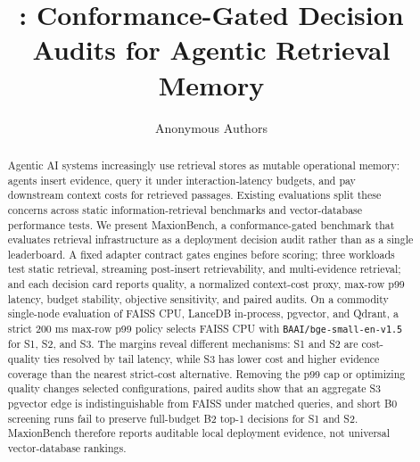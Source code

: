 \documentclass{article}
\title{\sys: Conformance-Gated Decision Audits for Agentic Retrieval Memory}
\author{Anonymous Authors}
\newcommand{\sys}{MaxionBench\xspace}
\newcommand{\maxrowp}{max-row p99\xspace}
\begin{document}
\maketitle

\begin{abstract}
Agentic AI systems increasingly use retrieval stores as mutable operational memory: agents insert evidence, query it under interaction-latency budgets, and pay downstream context costs for retrieved passages. Existing evaluations split these concerns across static information-retrieval benchmarks and vector-database performance tests. We present \sys, a conformance-gated benchmark that evaluates retrieval infrastructure as a deployment decision audit rather than as a single leaderboard. A fixed adapter contract gates engines before scoring; three workloads test static retrieval, streaming post-insert retrievability, and multi-evidence retrieval; and each decision card reports quality, a normalized context-cost proxy, \maxrowp latency, budget stability, objective sensitivity, and paired audits. On a commodity single-node evaluation of FAISS CPU, LanceDB in-process, pgvector, and Qdrant, a strict 200 ms \maxrowp policy selects FAISS CPU with \texttt{BAAI/bge-small-en-v1.5} for S1, S2, and S3. The margins reveal different mechanisms: S1 and S2 are cost-quality ties resolved by tail latency, while S3 has lower cost and higher evidence coverage than the nearest strict-cost alternative. Removing the p99 cap or optimizing quality changes selected configurations, paired audits show that an aggregate S3 pgvector edge is indistinguishable from FAISS under matched queries, and short B0 screening runs fail to preserve full-budget B2 top-1 decisions for S1 and S2. \sys therefore reports auditable local deployment evidence, not universal vector-database rankings.
\end{abstract}




\FloatBarrier

\FloatBarrier



\FloatBarrier
\clearpage



\clearpage
\appendix



\end{document}
